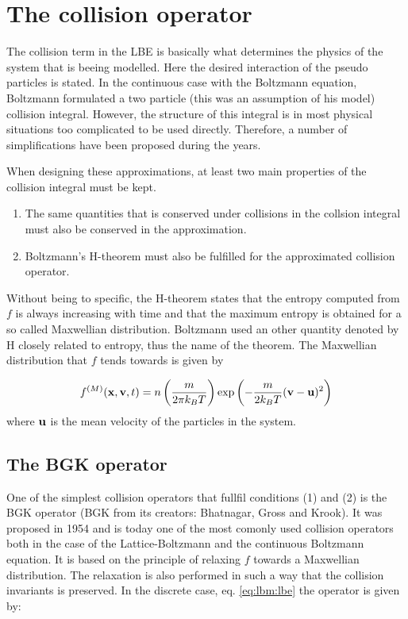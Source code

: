 \section{The collision operator}\label{sec:lbm:col}
The collision term in the LBE is basically what determines the physics
of the system that is beeing modelled. Here the desired interaction of
the pseudo particles is stated. In the continuous case with the
Boltzmann equation, Boltzmann formulated a two particle (this was an
assumption of his model) collision integral. However, the structure of
this integral is in most physical situations too complicated to be
used directly. Therefore, a number of simplifications have been
proposed during the years. 


When designing these approximations, at least two main properties of
the collision integral must be kept. \cite{wolf-gladrow}

\begin{enumerate}
  \item The same quantities that is conserved under collisions in the
    collsion integral must also be conserved in the approximation.
  \item Boltzmann's H-theorem must also be fulfilled for the
    approximated collision operator.
\end{enumerate}

Without being to specific, the H-theorem states that the entropy
computed from $f$ is always increasing with time and that the maximum
entropy is obtained for a so called Maxwellian distribution. Boltzmann
used an other quantity denoted by H closely related to entropy, thus
the name of the theorem. The Maxwellian distribution that $f$ tends
towards is given by

\begin{equation}\label{eq:lbm:maxwell}
f^{(M)}(\mathbf{x}, \mathbf{v}, t) = n \left ( \frac{m}{2 \pi k_B T} \right )
\exp{\left( -\frac{m}{2 k_B T} (\mathbf{v} - \ensuremath{\mathbf{u}})^2\right)}
\end{equation} 
where $\mathbf{u}$ is the mean velocity of the particles in the
system. 

\subsection{The BGK operator}
One of the simplest collision operators that fullfil conditions (1)
and (2) is the BGK operator (BGK from its creators: Bhatnagar, Gross
and Krook). It was proposed in 1954 and is today one of the most
comonly used collision operators both in the case of the
Lattice-Boltzmann and the continuous Boltzmann equation. It is based
on the principle of relaxing $f$ towards a Maxwellian
distribution. The relaxation is also performed in such a way that the
collision invariants is preserved.  In the discrete case,
eq. \eqref{eq:lbm:lbe} the operator is given by:

